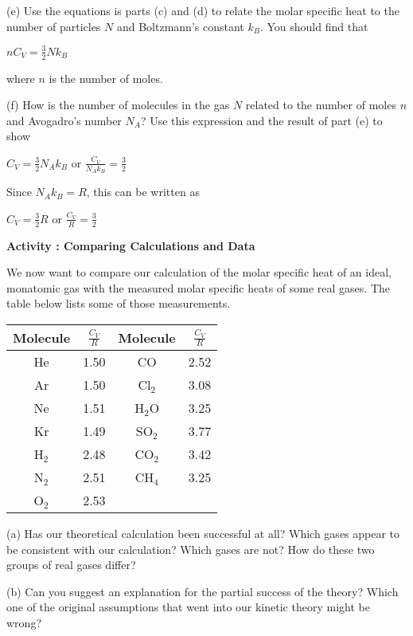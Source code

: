 (e) Use the equations is parts (c) and (d) to relate the molar specific
heat to the number of particles \( N \) and Boltzmann's constant \( k_{B} \).
You should find that
\vspace{1in}

{\centering \( nC_{V}=\frac{3}{2}Nk_{B} \)\par}

where \( n \) is the number of moles.
\vspace{1.5in}

(f) How is the number of molecules in the gas \( N \) related to the number
of moles \( n \) and Avogadro's number \( N_{A} \)? Use this expression
and the result of part (e) to show

{\centering \( C_{V}=\frac{3}{2}N_{A}k_{B} \) or \( \frac{C_{V}}{N_{A}k_{B}}=\frac{3}{2} \)\par}
\vspace{1.5in}

Since \( N_{A}k_{B}=R \), this can be written as

{\centering \( C_{V}=\frac{3}{2}R \) or \( \frac{C_{V}}{R}=\frac{3}{2} \)\par}
\vspace{0.3in}

\newpage

\textbf{Activity : Comparing Calculations and Data}

We now want to compare our calculation of the molar specific heat
of an ideal, monatomic gas with the measured molar specific heats
of some real gases. The table below lists some of those measurements.

\vspace{0.3cm}
{\centering \begin{tabular}{|c|c|c|c|}
\hline 
Molecule&
\( \frac{C_{V}}{R} \)&
Molecule&
\( \frac{C_{V}}{R} \)\\
\hline
\hline 
He&
1.50&
CO&
2.52\\
\hline 
Ar&
1.50&
Cl\( _{2} \)&
3.08\\
\hline 
Ne&
1.51&
H\( _{2} \)O&
3.25\\
\hline 
Kr&
1.49&
SO\( _{2} \)&
3.77\\
\hline 
H\( _{2} \)&
2.48&
CO\( _{2} \)&
3.42\\
\hline 
N\( _{2} \)&
2.51&
CH\( _{4} \)&
3.25\\
\hline 
O\( _{2} \)&
2.53&
&
\\
\hline
\end{tabular}\par}
\vspace{0.3cm}

(a) Has our theoretical calculation been successful at all? Which
gases appear to be consistent with our calculation? Which gases are
not? How do these two groups of real gases differ?
\vspace{1in}

(b) Can you suggest an explanation for the partial success of the
theory? Which one of the original assumptions that went into our kinetic
theory might be wrong?\vspace{2in}


